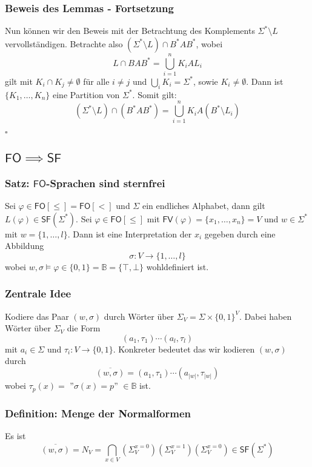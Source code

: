 \documentclass[12pt, german]{article}
\newcommand{\B}{\mathbb{B}}
\newcommand{\sigstern}{\Sigma^\ast}
\newcommand{\starfree}{\mathsf{SF}}
\newcommand{\bast}{B^{\ast}}
\newcommand{\sast}{\Sigma^{\ast}}
\newcommand{\fv}{\mathsf{FV}}
\newcommand{\fo}{\mathsf{FO}}
\newcommand{\bewiesen}{
	
	\begin{flushright}
		$\square$  \\
\end{flushright}}
\begin{document}
\subsubsection{Beweis des Lemmas - Fortsetzung}
	\label{sec:splitting_bew2}
	Nun können wir den Beweis mit der Betrachtung des Komplements $\sast\setminus L$ vervollständigen.
	Betrachte also $(\sigstern \setminus L) \cap \bast A \bast$, wobei $$L \cap BA\bast = \bigcup_{i = 1}^n K_i A L_i$$ gilt mit $K_i \cap K_j \not = \emptyset$ für alle $i \not = j$ und $\bigcup_i K_i = \sigstern$, sowie $K_i \not = \emptyset$. Dann ist $\{K_1, \ldots, K_n\}$ eine Partition von $\sigstern$. Somit gilt: $$(\sigstern \setminus L) \cap (\bast A \bast) = \bigcup_{i = 1}^nK_iA(\bast \setminus L_i)$$ 
	\bewiesen
	
\subsection{$\fo \implies \starfree$}
\subsubsection{Satz: $\fo$-Sprachen sind sternfrei}
	Sei $\varphi \in \fo[\leq] = \fo[<]$ und $\Sigma$ ein endliches Alphabet, dann gilt $L(\varphi) \in \starfree(\sigstern)$. Sei $\varphi \in \fo[\leq]$ mit $\fv(\varphi) = \{x_1, \ldots, x_n\} = V$ und $w \in \sigstern$ mit $w = \{1, \ldots, l\}$. Dann ist eine Interpretation der $x_i$ gegeben durch eine Abbildung $$\sigma: V \to \{1, \ldots,l\}$$ wobei $w, \sigma \models \varphi \in \{0,1\} = \B = \{\top, \bot\}$ wohldefiniert ist. 

\subsubsection{Zentrale Idee}
	Kodiere das Paar $(w, \sigma)$ durch Wörter über $\Sigma_V = \Sigma \times \{0,1\}^V$. Dabei haben Wörter über $\Sigma_V$ die Form $$(a_1, \tau_1) \cdots (a_l, \tau_l)$$ mit $a_i \in \Sigma$ und $\tau_i : V \to \{0,1\}$. Konkreter bedeutet das wir kodieren $(w, \sigma)$ durch $$\overline{(w, \sigma)} = (a_1, \tau_1) \cdots (a_{|w|}, \tau_{|w|})$$ wobei $\tau_p(x) =$ ''$\sigma(x) = p$'' $\in \B$ ist. 

\subsubsection{Definition: Menge der Normalformen}
	Es ist $$\overline{(w, \sigma)} = N_V = \bigcap_{x \in V} (\Sigma_V^{x=0})(\Sigma_V^{x=1})(\Sigma_V^{x=0}) \in \starfree(\sigstern)$$
\end{document}
